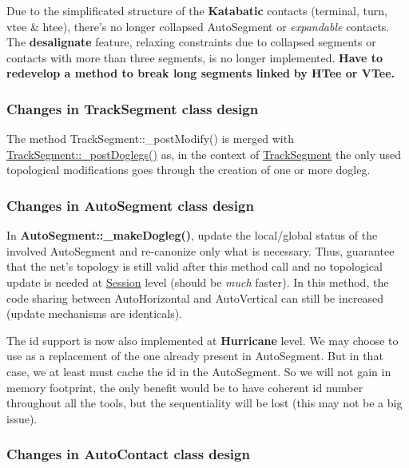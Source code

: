 \begin{DoxyItemize}
\item Due to the simplificated structure of the {\bf Katabatic} contacts (terminal, turn, vtee \& htee), there's no longer collapsed Auto\-Segment or {\itshape expandable} contacts. The {\bfseries desalignate} feature, relaxing constraints due to collapsed segments or contacts with more than three segments, is no longer implemented. {\bfseries Have to redevelop a method to break long segments linked} {\bfseries by H\-Tee or V\-Tee.}
\end{DoxyItemize}\hypertarget{pageNotes_ssecModificationsTrackSegment}{}\subsubsection{Changes in Track\-Segment class design}\label{pageNotes_ssecModificationsTrackSegment}

\begin{DoxyItemize}
\item The method {\ttfamily Track\-Segment\-::\-\_\-post\-Modify()} is merged with \hyperlink{classKite_1_1TrackSegment_a10a45c049d0bd7d01c7eff1c5441c7a2}{Track\-Segment\-::\-\_\-post\-Doglegs()} as, in the context of \hyperlink{classKite_1_1TrackSegment}{Track\-Segment} the only used topological modifications goes through the creation of one or more dogleg.
\end{DoxyItemize}\hypertarget{pageNotes_ssecModificationsAutoSegment}{}\subsubsection{Changes in Auto\-Segment class design}\label{pageNotes_ssecModificationsAutoSegment}

\begin{DoxyItemize}
\item In {\bf Auto\-Segment\-::\-\_\-make\-Dogleg()}, update the local/global status of the involved Auto\-Segment and re-\/canonize only what is necessary. Thus, guarantee that the net's topology is still valid after this method call and no topological update is needed at \hyperlink{classKite_1_1Session}{Session} level (should be {\itshape much} faster). In this method, the code sharing between Auto\-Horizontal and Auto\-Vertical can still be increased (update mechanisms are identicals).
\item The {\ttfamily id} support is now also implemented at {\bf Hurricane} level. We may choose to use as a replacement of the one already present in Auto\-Segment. But in that case, we at least must cache the id in the Auto\-Segment. So we will not gain in memory footprint, the only benefit would be to have coherent id number throughout all the tools, but the sequentiality will be lost (this may not be a big issue).
\end{DoxyItemize}\hypertarget{pageNotes_ssecModificationsAutoContact}{}\subsubsection{Changes in Auto\-Contact class design}\label{pageNotes_ssecModificationsAutoContact}

